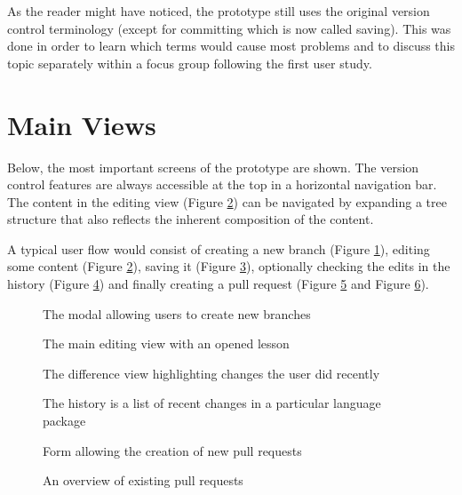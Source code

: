 As the reader might have noticed, the prototype still uses the original version control terminology (except for committing which is now called saving). This was done in order to learn which terms would cause most problems and to discuss this topic separately within a focus group following the first user study.

\section{Main Views}
Below, the most important screens of the prototype are shown. The version control features are always accessible at the top in a horizontal navigation bar. The content in the editing view (Figure \ref{fig:prot-initial-editor-view}) can be navigated by expanding a tree structure that also reflects the inherent composition of the content.

A typical user flow would consist of creating a new branch (Figure \ref{fig:create-branch}), editing some content (Figure \ref{fig:prot-initial-editor-view}), saving it (Figure \ref{fig:unsaved-changes}), optionally checking the edits in the history (Figure \ref{fig:history}) and finally creating a pull request (Figure \ref{fig:open-new-pr} and Figure \ref{fig:list-of-prs}).

\begin{figure}[h!]
 \centering
 \caption{The modal allowing users to create new branches}
 \label{fig:create-branch}
\end{figure}


\begin{figure}[h!]
 \centering
 \caption{The main editing view with an opened lesson}
 \label{fig:prot-initial-editor-view}
\end{figure}

\begin{figure}[h!]
 \centering
 \caption{The difference view highlighting changes the user did recently}
 \label{fig:unsaved-changes}
\end{figure}

\begin{figure}[h!]
 \centering
 \caption{The history is a list of recent changes in a particular language package}
 \label{fig:history}
\end{figure}

\begin{figure}[h!]
 \centering
 \caption{Form allowing the creation of new pull requests}
 \label{fig:open-new-pr}
\end{figure}

\begin{figure}[h!]
 \centering
 \caption{An overview of existing pull requests}
 \label{fig:list-of-prs}
\end{figure}
